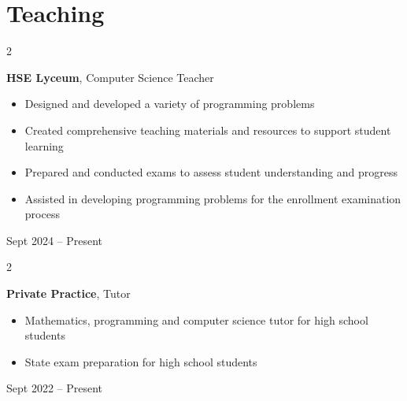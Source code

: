 \documentclass[10pt, letterpaper]{article}
\newenvironment{highlights}{
    \begin{itemize}[
        topsep=0.10 cm,
        parsep=0.10 cm,
        partopsep=0pt,
        itemsep=0pt,
        leftmargin=0.4 cm + 10pt
    ]
}{
    \end{itemize}
} %
\newenvironment{twocolentry}[2][]{
    \onecolentry
    \def\secondColumn{#2}
    \setcolumnwidth{\fill, 4.5 cm}
    \begin{paracol}{2}
}{
    \switchcolumn \raggedleft \secondColumn
    \end{paracol}
    \endonecolentry
} %
\begin{document}
    \section{Teaching}
        \begin{twocolentry}{
            Sept 2024 – Present
        }
            \textbf{HSE Lyceum}, Computer Science Teacher
                \begin{highlights}
                    \item Designed and developed a variety of programming problems
                    \item Created comprehensive teaching materials and resources to support student learning
                    \item Prepared and conducted exams to assess student understanding and progress
                    \item Assisted in developing programming problems for the enrollment examination process
                \end{highlights}
        \end{twocolentry}

        
        \begin{twocolentry}{
            Sept 2022 – Present
        }
            \textbf{Private Practice}, Tutor
            \begin{highlights}
                \item Mathematics, programming and computer science tutor for high school students
                \item State exam preparation for high school students
            \end{highlights}
        \end{twocolentry}
        \vspace{0.2 cm}  
\end{document}
